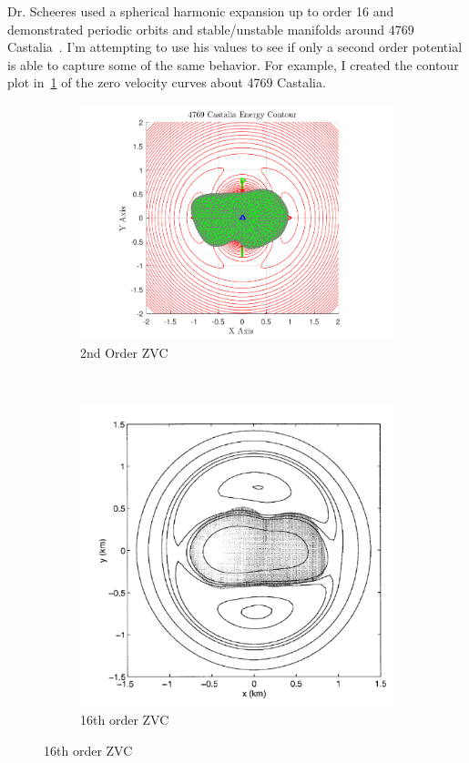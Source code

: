 Dr. Scheeres used a spherical harmonic expansion up to order 16 and demonstrated periodic orbits and stable/unstable manifolds around 4769 Castalia~\cite{scheeres1996}.
I'm attempting to use his values to see if only a second order potential is able to capture some of the same behavior. 
For example, I created the contour plot in~\cref{fig:2nd_castalia} of the zero velocity curves about 4769 Castalia.
\begin{figure}
	\centering
	\begin{subfigure}[b]{0.5\textwidth}
	\includegraphics[width=\textwidth]{figures/castalia_zero_velocity_curves}
	\caption{2nd Order ZVC\label{fig:2nd_castalia}}
	\end{subfigure}~
	\begin{subfigure}[b]{0.5\textwidth}
	\includegraphics[width=\textwidth]{figures/scheeres_castalia}
	\caption{16th order ZVC\label{fig:castalia}}
	\end{subfigure}
\end{figure}
